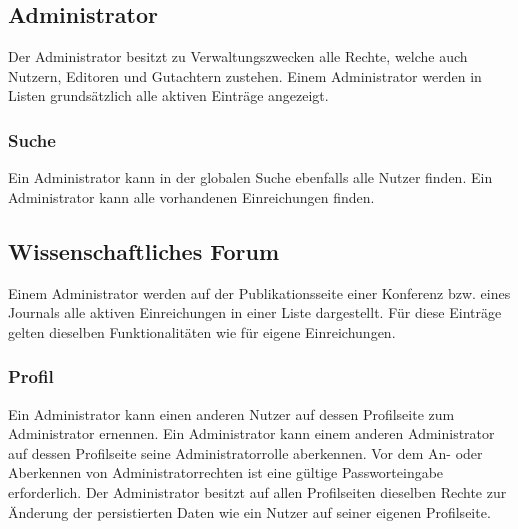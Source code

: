 \subsection{Administrator}
Der Administrator besitzt zu Verwaltungszwecken alle Rechte, welche auch Nutzern, Editoren
und Gutachtern zustehen. %
Einem Administrator werden in Listen grundsätzlich alle aktiven Einträge angezeigt.
\subsubsection{Suche}
\begin{description}
     Ein Administrator kann in der globalen Suche ebenfalls alle Nutzer finden.
     Ein Administrator kann alle vorhandenen Einreichungen finden.
\end{description}

\subsection{Wissenschaftliches Forum}
\begin{description}
     Einem Administrator werden auf der Publikationsseite einer Konferenz bzw. eines Journals
    alle aktiven Einreichungen in einer Liste dargestellt.
    Für diese Einträge gelten dieselben Funktionalitäten wie für eigene Einreichungen. %
\end{description}

\subsubsection{Profil}
\begin{description}
     Ein Administrator kann einen anderen Nutzer auf dessen Profilseite zum Administrator ernennen.
     Ein Administrator kann einem anderen Administrator auf dessen Profilseite seine
    Administratorrolle aberkennen.
     Vor dem An- oder Aberkennen von Administratorrechten ist eine gültige
    Passworteingabe erforderlich.
     Der Administrator besitzt auf allen Profilseiten dieselben Rechte zur Änderung
    der persistierten Daten wie ein Nutzer auf seiner eigenen Profilseite. %
\end{description}

